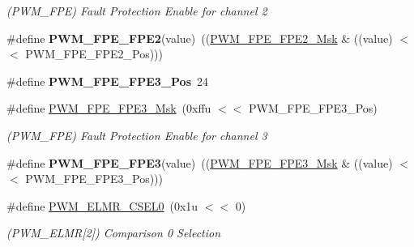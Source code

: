 \begin{DoxyCompactItemize}
\begin{DoxyCompactList}\small\item\em (P\+W\+M\+\_\+\+F\+PE) Fault Protection Enable for channel 2 \end{DoxyCompactList}\item 
\mbox{\label{group__SAME70__PWM_ga3a562170cbf8ff1723eab2792c2f6590}} 
\#define {\bfseries P\+W\+M\+\_\+\+F\+P\+E\+\_\+\+F\+P\+E2}(value)~((\mbox{\hyperlink{group__SAMV71__PWM_ga3dbe9d68d6f74bdebf54e40585180117}{P\+W\+M\+\_\+\+F\+P\+E\+\_\+\+F\+P\+E2\+\_\+\+Msk}} \& ((value) $<$$<$ P\+W\+M\+\_\+\+F\+P\+E\+\_\+\+F\+P\+E2\+\_\+\+Pos)))
\item 
\mbox{\label{group__SAME70__PWM_gab088806ad2c20b9973854e3b8a0fd33c}} 
\#define {\bfseries P\+W\+M\+\_\+\+F\+P\+E\+\_\+\+F\+P\+E3\+\_\+\+Pos}~24
\item 
\mbox{\label{group__SAME70__PWM_gaca9a5e5dcb472caf52d3c2c8b0321657}} 
\#define \mbox{\hyperlink{group__SAME70__PWM_gaca9a5e5dcb472caf52d3c2c8b0321657}{P\+W\+M\+\_\+\+F\+P\+E\+\_\+\+F\+P\+E3\+\_\+\+Msk}}~(0xffu $<$$<$ P\+W\+M\+\_\+\+F\+P\+E\+\_\+\+F\+P\+E3\+\_\+\+Pos)
\begin{DoxyCompactList}\small\item\em (P\+W\+M\+\_\+\+F\+PE) Fault Protection Enable for channel 3 \end{DoxyCompactList}\item 
\mbox{\label{group__SAME70__PWM_ga56f3977d54926be1c1452956df6b820f}} 
\#define {\bfseries P\+W\+M\+\_\+\+F\+P\+E\+\_\+\+F\+P\+E3}(value)~((\mbox{\hyperlink{group__SAMV71__PWM_gaca9a5e5dcb472caf52d3c2c8b0321657}{P\+W\+M\+\_\+\+F\+P\+E\+\_\+\+F\+P\+E3\+\_\+\+Msk}} \& ((value) $<$$<$ P\+W\+M\+\_\+\+F\+P\+E\+\_\+\+F\+P\+E3\+\_\+\+Pos)))
\item 
\mbox{\label{group__SAME70__PWM_ga469a975b28cf04cd35f871f253b7a3b3}} 
\#define \mbox{\hyperlink{group__SAME70__PWM_ga469a975b28cf04cd35f871f253b7a3b3}{P\+W\+M\+\_\+\+E\+L\+M\+R\+\_\+\+C\+S\+E\+L0}}~(0x1u $<$$<$ 0)
\begin{DoxyCompactList}\small\item\em (P\+W\+M\+\_\+\+E\+L\+MR\mbox{[}2\mbox{]}) Comparison 0 Selection \end{DoxyCompactList}\item 

\end{DoxyCompactItemize}

